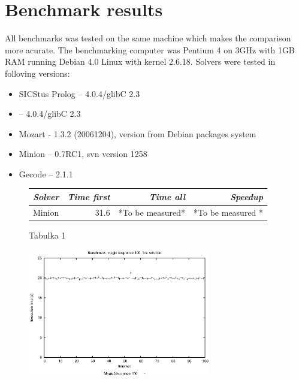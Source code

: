 \chapter{Benchmark results}
\thispagestyle{myheadings}

All benchmarks was tested on the same machine which makes the comparison more 
acurate. The benchmarking computer was Pentium 4 on 3GHz with 1GB RAM running
Debian 4.0 Linux with kernel 2.6.18. Solvers were tested in folloving versions:
\begin{itemize}
\item SICStus Prolog -- 4.0.4/glibC 2.3
\item \eclipse -- 4.0.4/glibC 2.3
\item Mozart - 1.3.2 (20061204), version from Debian packages system 
\item Minion -- 0.7RC1, svn version 1258
\item Gecode -- 2.1.1
\end{itemize}

\begin{figure}[Table]
\caption{Tabulka 1}
\begin{tabular}{lrrr}
\hline \itshape Solver	&	 \itshape Time first	&	\itshape Time all & \itshape Speedup \\
\hline Minion	&	 31.6 & *To be measured* & *To be measured * \\
\hline
\end{tabular}
\end{figure}

\begin{figure}
\begin{center}
\includegraphics[width=8cm]{images/grafy/100magic.eps}
\end{center}
\end{figure} 
